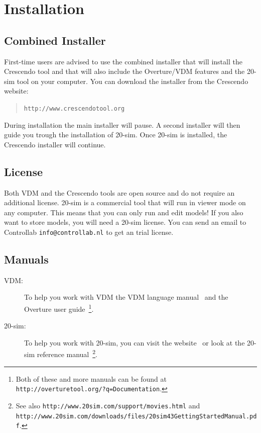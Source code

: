 \documentclass{crescendorepchap}
\newcommand{\url}[1]{\texttt{#1}}
\begin{document}
\section{Installation}\label{sec:install}

\subsection{Combined Installer}

First-time users are advised to use the combined installer that will
install the Crescendo tool and that will also include the Overture/VDM features and the 20-sim tool on your computer. You can
download the installer from the Crescendo website:

\begin{quote}
\url{http://www.crescendotool.org}
\end{quote}

During installation the main installer will pause. A second installer
will then guide you trough the installation of 20-sim. Once 20-sim is
installed, the Crescendo installer will continue.

\subsection{License}

Both VDM and the Crescendo tools are open source and do not require an
additional license. 20-sim is a commercial tool that will run in
viewer mode on any computer. This means that you
can only run and edit models!
If you also want to store models, you will need a 20-sim license. You can send an email to
Controllab \url{info@controllab.nl} to get an trial license.

\subsection{Manuals}

\begin{description}
\item[VDM:] To help you work with VDM the VDM language manual~\cite{Larsen&13b} and the Overture user guide~\cite{Larsen&13a}\footnote{Both of these and more manuals can be found at
  \url{http://overturetool.org/?q=Documentation}.}.
\item[20-sim:] To help you work with 20-sim, you can visit the
  website~\cite{20sim} or look at the 20-sim reference
  manual~\cite{Kleijn09}\footnote{See also
    \url{http://www.20sim.com/support/movies.html} and \\
    \url{http://www.20sim.com/downloads/files/20sim43GettingStartedManual.pdf}.}.
\end{description}
\end{document}

